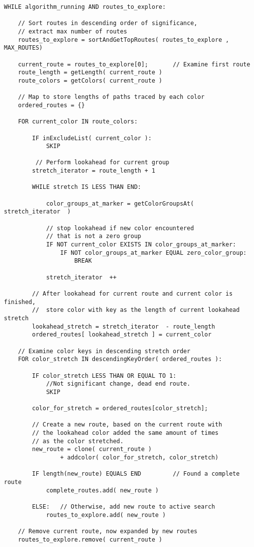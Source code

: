 \pagebreak
\begingroup
\begin{spacing}{0.9}
\begin{lstlisting}
WHILE algorithm_running AND routes_to_explore:

	// Sort routes in descending order of significance,
	// extract max number of routes
	routes_to_explore = sortAndGetTopRoutes( routes_to_explore , MAX_ROUTES)
		
	current_route = routes_to_explore[0];		// Examine first route
	route_length = getLength( current_route )
	route_colors = getColors( current_route )

	// Map to store lengths of paths traced by each color
	ordered_routes = {}  

	FOR current_color IN route_colors:
		
		IF inExcludeList( current_color ): 
			SKIP

		 // Perform lookahead for current group
		stretch_iterator = route_length + 1

		WHILE stretch IS LESS THAN END:

			color_groups_at_marker = getColorGroupsAt( stretch_iterator  )

			// stop lookahead if new color encountered
			// that is not a zero group
			IF NOT current_color EXISTS IN color_groups_at_marker:
				IF NOT color_groups_at_marker EQUAL zero_color_group:
					BREAK
			
			stretch_iterator  ++
	
		// After lookahead for current route and current color is finished,
		//  store color with key as the length of current lookahead stretch
		lookahead_stretch = stretch_iterator  - route_length
		ordered_routes[ lookahead_stretch ] = current_color

	// Examine color keys in descending stretch order
	FOR color_stretch IN descendingKeyOrder( ordered_routes ):
		
		IF color_stretch LESS THAN OR EQUAL TO 1:
			//Not significant change, dead end route.
			SKIP

		color_for_stretch = ordered_routes[color_stretch];

		// Create a new route, based on the current route with
		// the lookahead color added the same amount of times
		// as the color stretched.
		new_route = clone( current_route )
		        + addcolor( color_for_stretch, color_stretch)

		IF length(new_route) EQUALS END			// Found a complete route
			complete_routes.add( new_route )

		ELSE: 	// Otherwise, add new route to active search
			routes_to_explore.add( new_route )

	// Remove current route, now expanded by new routes
	routes_to_explore.remove( current_route )
\end{lstlisting}
\vspace{-10pt}
\label{code:astarbf}
\end{spacing}
\endgroup
\vspace{20pt}

